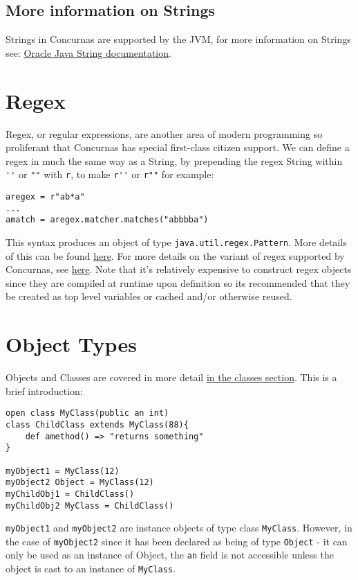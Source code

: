 \documentclass[conc-doc]{subfiles}
\begin{document}
\subsection{More information on Strings}
Strings in Concurnas are supported by the JVM, for more information on Strings see: \href{https://docs.oracle.com/javase/tutorial/java/data/strings.html}{Oracle Java String documentation}.

\section{Regex}
Regex, or regular expressions, are another area of modern programming so proliferant that Concurnas has special first-class citizen support. We can define a regex in much the same way as a String, by prepending the regex String within \lstinline{''} or \lstinline{""} with \lstinline{r}, to make \lstinline{r''} or \lstinline{r""} for example:
\begin{lstlisting}
aregex = r"ab*a"
...
amatch = aregex.matcher.matches("abbbba")
\end{lstlisting}

This syntax produces an object of type \lstinline{java.util.regex.Pattern}. More details of this can be found \href{https://docs.oracle.com/en/java/javase/12/docs/api/java.base/java/util/regex/Pattern.html}{here}. For more details on the variant of regex supported by Concurnas, see \href{https://docs.oracle.com/en/java/javase/12/docs/api/java.base/java/util/regex/Pattern.html}{here}. Note that it's relatively expensive to construct regex objects since they are compiled at runtime upon definition so its recommended that they be created as top level variables or cached and/or otherwise reused.

\section{Object Types}
Objects and Classes are covered in more detail \hyperref[ch:classes]{in the classes section}. This is a brief introduction:

\begin{lstlisting}
open class MyClass(public an int)
class ChildClass extends MyClass(88){
	def amethod() => "returns something"
}

myObject1 = MyClass(12)
myObject2 Object = MyClass(12)
myChildObj1 = ChildClass()
myChildObj2 MyClass = ChildClass()
\end{lstlisting}

\lstinline{myObject1} and \lstinline{myObject2} are instance objects of type class \lstinline{MyClass}. However, in the case of \lstinline{myObject2} since it has been declared as being of type \lstinline{Object} - it can only be used as an instance of Object, the \lstinline{an} field is not accessible unless the object is cast to an instance of \lstinline{MyClass}.
\end{document}
